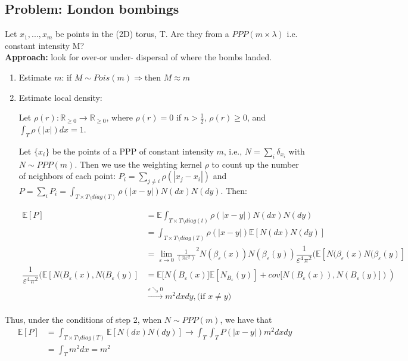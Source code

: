 \documentclass[12pt]{article}
\begin{document}
    \subsection*{Problem: London bombings} Let ${x_1,...,x_m}$ be points in the (2D) torus, T. Are they from a $PPP(m\times\lambda)$ i.e. constant intensity M?\\
    \textbf{Approach:} look for over-or under- dispersal of where the bombs landed.
    \begin{enumerate}
        \item Estimate $m$: if $M \sim Pois(m) \Rightarrow \text{then } M \approx m$
        
        \item Estimate local density: 
        
        Let $\rho(r):\mathbb{R}_{\geq 0}\rightarrow \mathbb{R}_{\geq 0}$, where $\rho(r)=0$ if $n>\frac{1}{2}$, $\rho(r) \geq 0$, and $\int_{T} \rho(|x|)dx=1$.
        
        Let $\{x_i\}$ be the points of a PPP of constant intensity $m$, i.e., $N=\sum_i \delta_{x_i}$ with  $N\sim PPP(m)$.
        Then we use the weighting kernel $\rho$ to count up the number of neighbors of each point: $P_i = \sum\limits_{j\neq i} \rho (|x_j-x_i|)$ and $P=\sum_i P_i =\int_{T\times T\setminus diag(T)} \rho(|x-y|)N(dx)N(dy)$. Then:
    
        $$\begin{aligned}
        \mathbb{E}[P] &= \mathbb{E}\int_{T\times T \setminus diag(t)}  \rho (|x-y|)N(dx)N(dy) \\
        &= \int_{T\times T \setminus diag(T)} \rho  (|x-y|) \mathbb{E}[N(dx)N(dy)] \\
        &= \lim_{\varepsilon \to 0} \frac{1}{(\pi \varepsilon^2)}^2 N(\beta_\varepsilon(x))N(\beta_\varepsilon(y)) 
        \dfrac{1}{\varepsilon^4\pi^2}(\mathbb{E}[N(\beta_\varepsilon(x)N(\beta_\varepsilon(y)] \\ 
       \dfrac{1}{\varepsilon^4\pi^2} (\mathbb{E}[N(B_\varepsilon(x),N(B_\varepsilon(y)]&= \mathbb{E}[N(B_\varepsilon(x)]\mathbb{E}[N_B_\varepsilon(y)]+ cov[N(B_\varepsilon(x)), N(B_\varepsilon(y)]))\\
        & \xrightarrow[]{\varepsilon \searrow 0} m^2dxdy, \text{(if } x \neq y)
        \end{aligned}$$
    \end{enumerate}
    
    \noindent Thus, under the conditions of step 2, when $N\sim PPP(m)$, we have that
    $$\begin{aligned}
    \mathbb{E}[P] &= \int_{T\times T \setminus diag(T)} \mathbb{E}[N(dx)N(dy)] \rightarrow \int_T \int_T P(|x-y|)m^2 dxdy\\
     &= \int_T m^2 dx = m^2
    \end{aligned}$$
    
\end{document}
